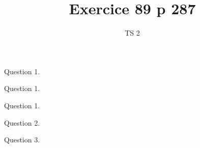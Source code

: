 \documentclass[handout,%
french,onlymath]{beamer}
\title{Exercice 89 p 287}
\author{TS 2}\institute{\augustin{0.2}}
\date{}
\begin{document}



\begin{frame}
 \titlepage
\end{frame}
\begin{frame}{Question 1.}



\end{frame}
\begin{frame}{Question 1.}


\end{frame}
\begin{frame}{Question 1.}


\end{frame}
\begin{frame}{Question 2.}



\end{frame}
\begin{frame}{Question 3.}



\end{frame}


\end{document}
